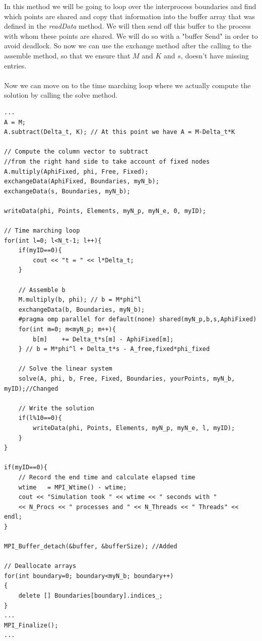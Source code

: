 \documentclass[12pt]{article}
\begin{document}
In this method we will be going to loop over the interprocess boundaries and find which points are shared and copy that information into the buffer array that was defined in the \textit{readData} method. We will then send off this buffer to the process with whom these points are shared. We will do so with a "buffer Send" in order to avoid deadlock. So now we can use the exchange method after the calling to the assemble method, so that we ensure that $M$ and $K$ and $s$, doesn't have missing entries.
\\\\
Now we can move on to the time marching loop where we actually compute the solution by calling the solve method. 

\begin{lstlisting}[style=MyC++Style]
...
A = M;
A.subtract(Delta_t, K); // At this point we have A = M-Delta_t*K

// Compute the column vector to subtract 
//from the right hand side to take account of fixed nodes
A.multiply(AphiFixed, phi, Free, Fixed);
exchangeData(AphiFixed, Boundaries, myN_b); 
exchangeData(s, Boundaries, myN_b);

writeData(phi, Points, Elements, myN_p, myN_e, 0, myID);

// Time marching loop
for(int l=0; l<N_t-1; l++){
	if(myID==0){
		cout << "t = " << l*Delta_t;
	}

	// Assemble b
	M.multiply(b, phi); // b = M*phi^l
	exchangeData(b, Boundaries, myN_b);
	#pragma omp parallel for default(none) shared(myN_p,b,s,AphiFixed)
	for(int m=0; m<myN_p; m++){
		b[m]	+= Delta_t*s[m] - AphiFixed[m];
	} // b = M*phi^l + Delta_t*s - A_free,fixed*phi_fixed

	// Solve the linear system
	solve(A, phi, b, Free, Fixed, Boundaries, yourPoints, myN_b, myID);//Changed

	// Write the solution
	if(l%10==0){
		writeData(phi, Points, Elements, myN_p, myN_e, l, myID);
	}
}

if(myID==0){
	// Record the end time and calculate elapsed time
	wtime	= MPI_Wtime() - wtime;	
	cout << "Simulation took " << wtime << " seconds with " 
	<< N_Procs << " processes and " << N_Threads << " Threads" << endl;
} 

MPI_Buffer_detach(&buffer, &bufferSize); //Added

// Deallocate arrays
for(int boundary=0; boundary<myN_b; boundary++)
{
	delete [] Boundaries[boundary].indices_;
}
...
MPI_Finalize();
...
\end{lstlisting}
\end{document}
